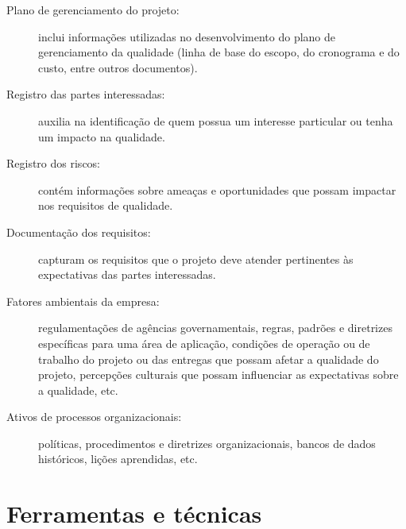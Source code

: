 \begin{description}
	
	\item[Plano de gerenciamento do projeto:] inclui informações utilizadas no desenvolvimento do plano de gerenciamento da qualidade (linha de base do escopo, do cronograma e do custo, entre outros documentos).
	
	\item[Registro das partes interessadas:] auxilia na identificação de quem possua um interesse particular ou tenha um impacto na qualidade.
	
	\item[Registro dos riscos:] contém informações sobre ameaças e oportunidades que possam impactar nos requisitos de qualidade.
	
	\item[Documentação dos requisitos:] capturam os requisitos que o projeto deve atender pertinentes às expectativas das partes interessadas.
	
	\item[Fatores ambientais da empresa:] regulamentações de agências governamentais, regras, padrões e diretrizes específicas para uma área de aplicação, condições de operação ou de trabalho do projeto ou das entregas que possam afetar a qualidade do projeto, percepções culturais que possam influenciar as expectativas sobre a qualidade, etc.
	
	\item[Ativos de processos organizacionais:] políticas, procedimentos e diretrizes organizacionais, bancos de dados históricos, lições aprendidas, etc.
	
\end{description}

\section{Ferramentas e técnicas}

